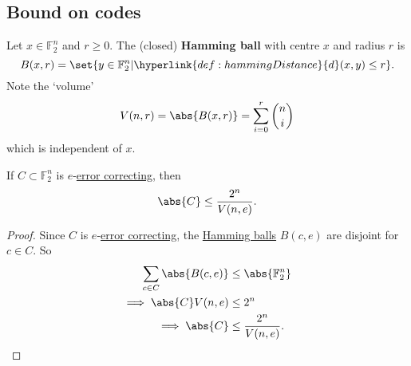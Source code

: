 \documentclass{article}
\newcommand{\1}[1]{\mathbbm{1}_{#1}}
\begin{document}
\subsection{Bound on codes}
\begin{defi}
    Let $x \in \mathbb{F}_2^n$ and $r \geq 0$. The (closed) \hypertarget{def:hammingBall}{\textbf{Hamming ball}} with centre $x$ and radius $r$ is
    \begin{equation*}
        B(x, r) = \set{y \in \mathbb{F}_2^n | \hyperlink{def:hammingDistance}{d}(x, y) \leq r}.
    \end{equation*}
    Note the `volume'
    \begin{equation*}
        V(n, r) = \abs{B(x, r)} = \sum_{i=0}^r \binom{n}{i}
    \end{equation*}
    which is independent of $x$.
\end{defi}
\begin{nlemma}\label{lem:2.5}
    If $C \subset \mathbb{F}_2^n$ is $e$-\hyperlink{def:errorCor}{error correcting}, then
    \begin{equation*}
        \abs{C} \leq \frac{2^n}{V(n, e)}.
    \end{equation*}
\end{nlemma}
\begin{proof}
    Since $C$ is $e$-\hyperlink{def:errorCor}{error correcting}, the \hyperlink{def:hammingBall}{Hamming balls} $B(c, e)$ are disjoint for $c \in C$.
    So
    \begin{align*}
        \sum_{c \in C} \abs{B(c, e)} &\leq \abs{\mathbb{F}_2^n} \\
        \implies \abs{C} V(n, e) &\leq 2^n \\
        \implies \abs{C} &\leq \frac{2^n}{V(n, e)}.\qedhere
    \end{align*}
\end{proof}
\end{document}
